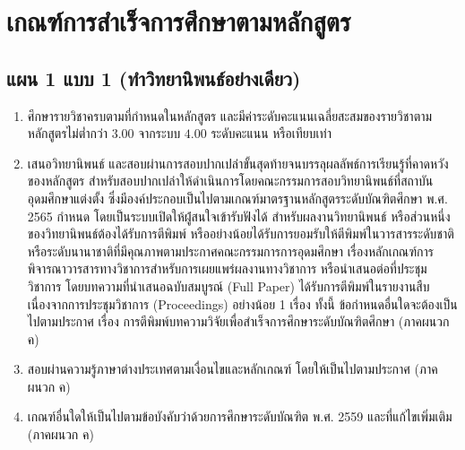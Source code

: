 \section{เกณฑ์การสำเร็จการศึกษาตามหลักสูตร}
\subsection{แผน 1 แบบ 1 (ทำวิทยานิพนธ์อย่างเดียว)}
\begin{enumerate}
   	\item ศึกษารายวิชาครบตามที่กำหนดในหลักสูตร และมีค่าระดับคะแนนเฉลี่ยสะสมของรายวิชาตามหลักสูตรไม่ต่ำกว่า $3.00$ จากระบบ $4.00$ ระดับคะแนน หรือเทียบเท่า 
   	\item เสนอวิทยานิพนธ์ และสอบผ่านการสอบปากเปล่าขั้นสุดท้ายจนบรรลุผลลัพธ์การเรียนรู้ที่คาดหวังของหลักสูตร สำหรับสอบปากเปล่าให้ดำเนินการโดยคณะกรรมการสอบวิทยานิพนธ์ที่สถาบันอุดมศึกษาแต่งตั้ง ซึ่งมีองค์ประกอบเป็นไปตามเกณฑ์มาตรฐานหลักสูตรระดับบัณฑิตศึกษา พ.ศ. 2565 กำหนด โดยเป็นระบบเปิดให้ผู่้สนใจเข้ารับฟังได้ สำหรับผลงานวิทยานิพนธ์ หรือส่วนหนึ่งของวิทยานิพนธ์ต้องได้รับการตีพิมพ์ หรืออย่างน้อยได้รับการยอมรับให้ตีพิมพ์ในวารสารระดับชาติหรือระดับนานาชาติที่มีคุณภาพตามประกาศคณะกรรมการการอุดมศึกษา เรื่องหลักเกณฑ์การพิจารณาวารสารทางวิชาการสำหรับการเผยแพร่ผลงานทางวิชาการ หรือนำเสนอต่อที่ประชุมวิชาการ โดยบทความที่นำเสนอฉบับสมบูรณ์ (Full Paper) ได้รับการตีพิมพ์ในรายงานสืบเนื่องจากการประชุมวิชาการ (Proceedings) อย่างน้อย 1 เรื่อง ทั้งนี้ ข้อกำหนดอื่นใดจะต้องเป็นไปตามประกาศ \university เรื่อง การตีพิมพ์บทความวิจัยเพื่อสำเร็จการศึกษาระดับบัณฑิตศึกษา (ภาคผนวก ค)
   	\item สอบผ่านความรู้ภาษาต่างประเทศตามเงื่อนไขและหลักเกณฑ์ โดยให้เป็นไปตามประกาศ\university \,\,(ภาคผนวก ค)
   	\item เกณฑ์อื่นใดให้เป็นไปตามข้อบังคับ\university ว่าด้วยการศึกษาระดับบัณฑิต พ.ศ. 2559 และที่แก้ไขเพิ่มเติม (ภาคผนวก ค)   	 \end{enumerate}
